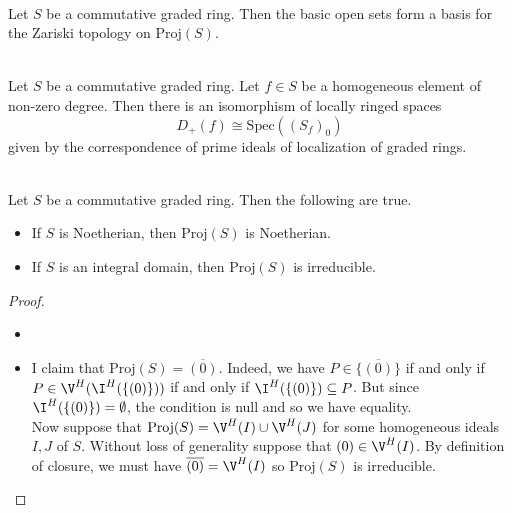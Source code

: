 \documentclass[a4paper]{article}
\begin{document}
\begin{lmm}{}{}\\
Let $S$ be a commutative graded ring. Then the basic open sets form a basis for the Zariski topology on $\text{Proj}(S)$. 
\end{lmm}

\begin{lmm}{}{}\\
Let $S$ be a commutative graded ring. Let $f\in S$ be a homogeneous element of non-zero degree. Then there is an isomorphism of locally ringed spaces $$D_+(f)\cong\text{Spec}((S_f)_0)$$ given by the correspondence of prime ideals of localization of graded rings. 
\end{lmm}

\begin{prp}{}{}\\
Let $S$ be a commutative graded ring. Then the following are true. 
\begin{itemize}
\item If $S$ is Noetherian, then $\text{Proj}(S)$ is Noetherian. 
\item If $S$ is an integral domain, then $\text{Proj}(S)$ is irreducible. 
\end{itemize}
\begin{proof}
\begin{itemize}
\item
\item I claim that $\text{Proj}(S)=\overline{(0)}$. Indeed, we have $P\in\overline{\{(0)\}}$ if and only if $P\in\V^H(\I^H(\{(0)\}))$ if and only if $\I^H(\{(0)\})\subseteq P$. But since $\I^H(\{(0)\})=\emptyset$, the condition is null and so we have equality. \\

Now suppose that $\text{Proj}(S)=\V^H(I)\cup\V^H(J)$ for some homogeneous ideals $I,J$ of $S$. Without loss of generality suppose that $(0)\in\V^H(I)$. By definition of closure, we must have $\overline{(0)}=\V^H(I)$ so $\text{Proj}(S)$ is irreducible. 
\end{itemize}
\end{proof}
\end{prp}
\end{document}
